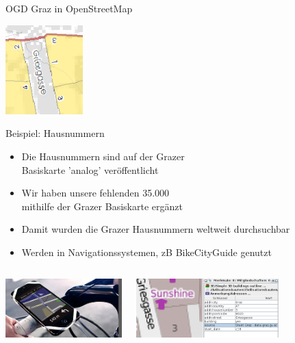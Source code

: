 \documentclass{beamer}
\begin{document}
\begin{frame}{OGD Graz in OpenStreetMap}
    
  \vspace*{-1.9cm}
 \hfill \includegraphics[width=3.0cm]{basiskarte.png}

  \vspace*{-2.0cm}
    Beispiel: Hausnummern

    \begin{itemize}
        \item Die Hausnummern sind auf der Grazer \\ Basiskarte 'analog' veröffentlicht
        \item Wir haben unsere fehlenden 35.000 \\mithilfe  der Grazer Basiskarte ergänzt
  \vspace*{0.2cm}
        \item Damit wurden die Grazer Hausnummern weltweit durchsuchbar
        \item Werden in Navigationssystemen, zB BikeCityGuide genutzt
    \end{itemize}

  \vspace*{-0.7cm}
\begin{columns}[c]
\begin{center}
\includegraphics[width=4.5cm]{bcg.png}
\end{center}
\begin{center}
\includegraphics[width=5.5cm]{osm-gg3.png}
\end{center}
\end{columns}

\end{frame}
\end{document}
